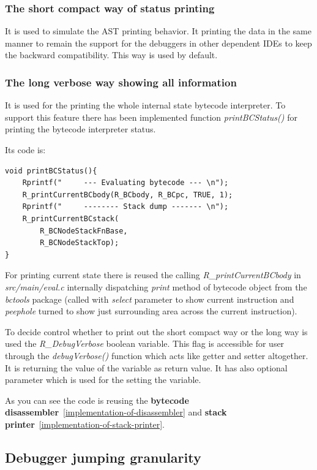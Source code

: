 \documentclass[thesis=M,english]{FITthesis}[2018/10/20]
\begin{document}
\subsubsection{The short compact way of status printing}\label{short-compact-way-of-status-printing}
It is used to simulate the AST printing behavior. It printing the data in the same manner to remain the support for the debuggers in other dependent IDEs to keep the backward compatibility. This way is used by default.

\subsubsection{The long verbose way showing all information}
It is used for the printing the whole internal state bytecode interpreter. To support this feature there has been implemented function \textit{printBCStatus()} for printing the bytecode interpreter status.

Its code is:
\begin{lstlisting}
void printBCStatus(){
    Rprintf("     --- Evaluating bytecode --- \n");
    R_printCurrentBCbody(R_BCbody, R_BCpc, TRUE, 1);
    Rprintf("     -------- Stack dump ------- \n");
    R_printCurrentBCstack(
    	R_BCNodeStackFnBase, 
    	R_BCNodeStackTop);
}
\end{lstlisting}

For printing current state there is reused the calling \textit{R{\_}printCurrentBCbody} in \textit{src/main/eval.c} internally dispatching \textit{print} method of bytecode object from the \textit{bctools} package (called with \textit{select} parameter to show current instruction and \textit{peephole} turned to show just surrounding area across the current instruction).

To decide control whether to print out the short compact way or the long way is used the \textit{R{\_}DebugVerbose} boolean variable. This flag is accessible for user through the \textit{debugVerbose()} function which acts like getter and setter altogether. It is returning the value of the variable as return value. It has also optional parameter which is used for the setting the variable. 

As you can see the code is reusing the \textbf{bytecode disassembler}~\ref{implementation-of-disassembler} and \textbf{stack printer}~\ref{implementation-of-stack-printer}.

\subsection{Debugger jumping granularity}\label{debugger-jumping-granuality}
\end{document}
